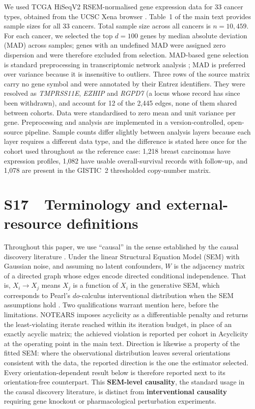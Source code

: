 \documentclass[11pt]{article}
\begin{document}
We used TCGA HiSeqV2 RSEM-normalised gene expression data \citep{li2011rsem} for 33 cancer types, obtained from the UCSC Xena browser \citep{goldman2020visualizing}. Table~1 of the main text provides sample sizes for all 33 cancers. Total sample size across all cancers is $n = 10{,}459$. For each cancer, we selected the top $d = 100$ genes by median absolute deviation (MAD) across samples; genes with an undefined MAD were assigned zero dispersion and were therefore excluded from selection. MAD-based gene selection is standard preprocessing in transcriptomic network analysis \citep{langfelder2008wgcna}; MAD is preferred over variance because it is insensitive to outliers. Three rows of the source matrix carry no gene symbol and were annotated by their Entrez identifiers. They were resolved as \emph{TMPRSS11E}, \emph{EZHIP} and \emph{RGPD7} (a locus whose record has since been withdrawn), and account for 12 of the 2,445 edges, none of them shared between cohorts. Data were standardised to zero mean and unit variance per gene. Preprocessing and analysis are implemented in a version-controlled, open-source pipeline. Sample counts differ slightly between analysis layers because each layer requires a different data type, and the difference is stated here once for the cohort used throughout as the reference case: 1{,}218 breast carcinomas have expression profiles, 1{,}082 have usable overall-survival records with follow-up, and 1{,}078 are present in the GISTIC~2 thresholded copy-number matrix.

\section*{S17\ \ Terminology and external-resource definitions}

Throughout this paper, we use ``causal'' in the sense established by the causal discovery literature \citep{pearl2009causality,spirtes2000causation,zheng2018dags}. Under the linear Structural Equation Model (SEM) with Gaussian noise, and assuming no latent confounders, $W$ is the adjacency matrix of a directed graph whose edges encode directed conditional independence. That is, $X_i \to X_j$ means $X_j$ is a function of $X_i$ in the generative SEM, which corresponds to Pearl's $do$-calculus interventional distribution when the SEM assumptions hold \citep{pearl2009causality}. Two qualifications warrant mention here, before the limitations. NOTEARS imposes acyclicity as a differentiable penalty and returns the least-violating iterate reached within its iteration budget, in place of an exactly acyclic matrix; the achieved violation is reported per cohort in Acyclicity at the operating point in the main text. Direction is likewise a property of the fitted SEM: where the observational distribution leaves several orientations consistent with the data, the reported direction is the one the estimator selected. Every orientation-dependent result below is therefore reported next to its orientation-free counterpart. This \textbf{SEM-level causality}, the standard usage in the causal discovery literature, is distinct from \textbf{interventional causality} requiring gene knockout or pharmacological perturbation experiments.
\end{document}

